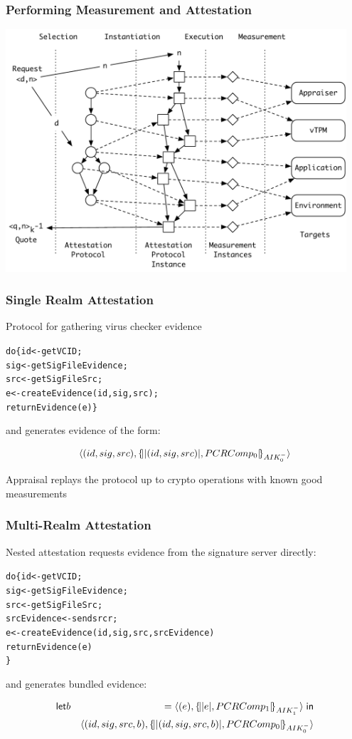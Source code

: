 \documentclass{beamer}
\begin{document}
\begin{frame}
  \frametitle{Performing Measurement and Attestation}
  \begin{center}
  \includegraphics[width=0.95\textwidth]{figures/ap-1.pdf}
  \end{center}
\end{frame}

\begin{frame}[fragile]
  \frametitle{Single Realm Attestation}

Protocol for gathering virus checker evidence

\begin{alltt}
  do \{ id <- getVCID;
       sig <- getSigFileEvidence;
       src <- getSigFileSrc;
       e <- createEvidence(id,sig,src);
       returnEvidence(e) \}
\end{alltt}

\noindent and generates evidence of the form:

\[\langle (id,sig,src),\{\!\lvert \lvert (id,sig,src) \rvert,PCRComp_0\rvert\!\}_{AIK_0^{-}}\rangle\]

\noindent Appraisal replays the protocol up to crypto operations with
known good measurements

\end{frame}

\begin{frame}[fragile]
  \frametitle{Multi-Realm Attestation}

Nested attestation requests evidence from the signature server directly:

\begin{alltt}
  do \{ id <- getVCID;
       sig <- getSigFileEvidence;
       src <- getSigFileSrc;
       srcEvidence <- send src r;
       e <- createEvidence(id,sig,src,srcEvidence)
       returnEvidence(e)
  \}
\end{alltt}

\noindent and generates bundled evidence:

\begin{eqnarray*}
  \mathsf{let} & b & = \langle (e),\{\!\lvert \lvert e \rvert,PCRComp_1\rvert\!\}_{AIK_1^{-}}\rangle\; \mathsf{in} \\
  & & \langle (id,sig,src,b),\{\!\lvert \lvert (id,sig,src,b) \rvert,PCRComp_0\rvert\!\}_{AIK_0^{-}}\rangle
\end{eqnarray*}
\end{frame}
\end{document}
